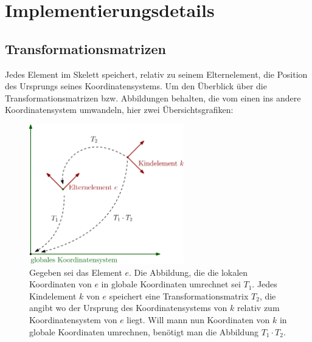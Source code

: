 \chapter{Implementierungsdetails}

\section{Transformationsmatrizen}

Jedes Element im Skelett speichert, relativ zu seinem Elternelement, die Position des Ursprungs seines Koordinatensystems. Um den Überblick über die Transformationsmatrizen bzw. Abbildungen behalten, die vom einen ins andere Koordinatensystem umwandeln, hier zwei Übersichtsgrafiken:

\begin{figure}
 \centering
 \includegraphics[width=0.6\textwidth]{graphics/transformation_matrices.eps}
 \caption{Gegeben sei das Element $e$. Die Abbildung, die die lokalen Koordinaten von $e$ in globale Koordinaten umrechnet sei $T_1$.
 Jedes Kindelement $k$ von $e$ speichert eine Transformationsmatrix $T_2$, die angibt wo der Ursprung des Koordinatensystems von $k$ relativ zum Koordinatensystem von $e$ liegt. Will mann nun Koordinaten von $k$ in globale Koordinaten umrechnen, benötigt man die Abbildung $T_1 \cdot T_2$.}
\end{figure}

